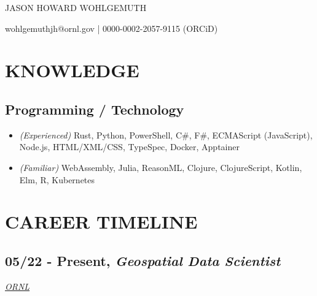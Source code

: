 \documentclass[10pt]{article}
\def\tightlist{}
\begin{document}
\begin{center}\Huge {JASON HOWARD WOHLGEMUTH}\end{center}
\begin{center}wohlgemuthjh@ornl.gov | 0000-0002-2057-9115 (ORCiD)\end{center}

\section{KNOWLEDGE}\label{knowledge}

\subsection{Programming / Technology}\label{programming-technology}

\begin{itemize}
\tightlist
\item
  \emph{(Experienced)} Rust, Python, PowerShell, C\#, F\#, ECMAScript
  (JavaScript), Node.js, HTML/XML/CSS, TypeSpec, Docker, Apptainer
\item
  \emph{(Familiar)} WebAssembly, Julia, ReasonML, Clojure,
  ClojureScript, Kotlin, Elm, R, Kubernetes
\end{itemize}

\section{CAREER TIMELINE}\label{career-timeline}

\subsection{\texorpdfstring{05/22 - Present, \textbf{\emph{Geospatial
Data
Scientist}}}{05/22 - Present, Geospatial Data Scientist}}\label{present-geospatial-data-scientist}

\emph{\href{https://twitter.com/ORNL}{ORNL}}
\end{document}
